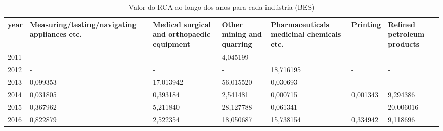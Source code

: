 \begin{table}
\centering
\caption{Valor do RCA ao longo dos anos para cada indústria (BES)}
\begin{tabular}{p{1cm}p{2cm}p{2cm}p{2cm}p{2cm}p{2cm}p{2cm}}
\toprule
 year &  Measuring/testing/navigating appliances etc. &  Medical surgical and orthopaedic equipment &  Other mining and quarring &  Pharmaceuticals medicinal chemicals etc. &  Printing &  Refined petroleum products \\
\midrule
 2011 &                                             - &                                           - &                   4,045199 &                                         - &         - &                           - \\
 2012 &                                             - &                                           - &                          - &                                 18,716195 &         - &                           - \\
 2013 &                                      0,099353 &                                   17,013942 &                  56,015520 &                                  0,030693 &         - &                           - \\
 2014 &                                      0,031805 &                                    0,393184 &                   2,541481 &                                  0,000715 &  0,001343 &                    9,294386 \\
 2015 &                                      0,367962 &                                    5,211840 &                  28,127788 &                                  0,061341 &         - &                   20,006016 \\
 2016 &                                      0,822879 &                                    2,522354 &                  18,050687 &                                 15,738154 &  0,334942 &                    9,118696 \\
\bottomrule
\end{tabular}
\end{table}
